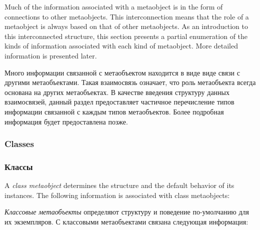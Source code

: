 Much of the information associated with a metaobject is in the form of
connections to other metaobjects. This interconnection means that the role of a
metaobject is always based on that of other metaobjects. As an introduction to
this interconnected structure, this section presents a partial enumeration of
the kinds of information associated with each kind of metaobject. More detailed
information is presented later. 

Много информации связанной с метаобъектом находится в виде виде связи с другими
метаобъектами. Такая взаимосвязь означает, что роль метаобъекта всегда основана
на других метаобъектах. В качестве введения структуру данных взаимосвязей,
данный раздел предоставляет частичное перечисление типов информации связанной с
каждым типов метаобъектов. Более подробная информация будет предоставлена позже.

\subsubsection{Classes}

\subsubsection{Классы}

A \emph{class metaobject} determines the structure and the default behavior of its
instances. The following information is associated with class metaobjects: 

\emph{Классовые метаобъекты} определяют структуру и поведение по-умолчанию для
их экземпляров. С классовыми метаобъектами связана следующая информация:

